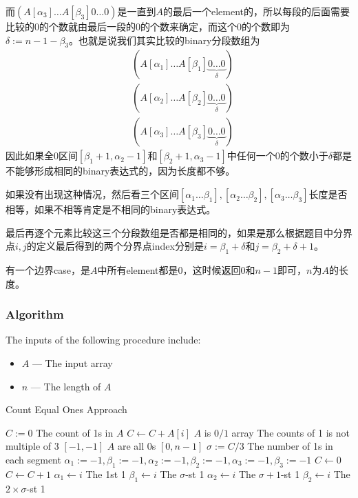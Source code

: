 \begin{CJK*}{UTF8}{gbsn}
而$(A[\alpha_3]\ldots A[\beta_3]0\ldots0)$是一直到$A$的最后一个element的，所以每段的后面需要比较的0的个数就由最后一段的0的个数来确定，而这个0的个数即为$\delta:=n-1-\beta_3$。也就是说我们其实比较的binary分段数组为
\begin{align*}
&(A[\alpha_1]\ldots A[\beta_1]\underbrace{0\ldots0}_{\delta})\\
&(A[\alpha_2]\ldots A[\beta_2]\underbrace{0\ldots0}_{\delta})\\
&(A[\alpha_3]\ldots A[\beta_3]\underbrace{0\ldots0}_{\delta})
\end{align*}
因此如果全0区间$[\beta_1+1, \alpha_2-1]$和$[\beta_2+1, \alpha_3-1]$中任何一个0的个数小于$\delta$都是不能够形成相同的binary表达式的，因为长度都不够。
\par
如果没有出现这种情况，然后看三个区间$[\alpha_1\ldots\beta_1], [\alpha_2\ldots\beta_2], [\alpha_3\ldots\beta_3]$长度是否相等，如果不相等肯定是不相同的binary表达式。
\par
最后再逐个元素比较这三个分段数组是否都是相同的，如果是那么根据题目中分界点$i,j$的定义最后得到的两个分界点index分别是$i=\beta_1 + \delta$和$j=\beta_2+\delta+1$。
\par
有一个边界case，是$A$中所有element都是0，这时候返回0和$n-1$即可，$n$为$A$的长度。
\end{CJK*}
\subsubsection{Algorithm}
The inputs of the following procedure include:
\begin{itemize}
\item $A$ --- The input array
\item $n$ --- The length of $A$
\end{itemize}
\setcounter{algorithm}{0}
\begin{algorithm}[H]
\caption{Count Equal Ones Approach}
\begin{algorithmic}[1]
\State $C:=0$ \Comment The count of 1s in $A$
\State $C\gets C+A[i]$ \Comment $A$ is $0/1$ array
\EndFor
{} \Comment The counts of 1 is not multiple of 3
\State \Return $[-1,-1]$
\EndIf
{} \Comment $A$ are all 0s
\State \Return $[0,n-1]$
\EndIf
\State $\sigma := C / 3$ \Comment The number of 1s in each segment
\State $\alpha_1:=-1, \beta_1:=-1, \alpha_2:=-1, \beta_2:=-1,\alpha_3:=-1, \beta_3:=-1$
\State $C\gets 0$
 \label{927for1}
 \label{927if1}
\State $C\gets C+1$
\State $\alpha_1 \gets i$ \Comment The 1st 1
\EndIf
{}
\State $\beta_1 \gets i$ \Comment The $\sigma$-st 1
\EndIf
{}
\State $\alpha_2 \gets i$ \Comment The $\sigma+1$-st 1
\EndIf
{}
\State $\beta_2 \gets i$ \Comment The $2\times\sigma$-st 1
\EndIf
{}
\end{algorithmic}
\end{algorithm}

